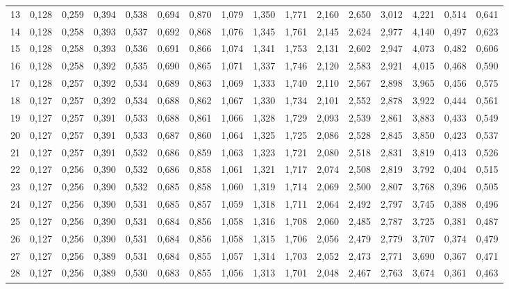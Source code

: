 \documentclass[
]{article}
\begin{document}
\begin{table}[!h]
{\begin{tabular}[t]{lccccccccccccccc}
13 & 0,128 & 0,259 & 0,394 & 0,538 & 0,694 & 0,870 & 1,079 & 1,350 & 1,771 & 2,160 & 2,650 & 3,012 & 4,221 & 0,514 & 0,641\\
14 & 0,128 & 0,258 & 0,393 & 0,537 & 0,692 & 0,868 & 1,076 & 1,345 & 1,761 & 2,145 & 2,624 & 2,977 & 4,140 & 0,497 & 0,623\\
15 & 0,128 & 0,258 & 0,393 & 0,536 & 0,691 & 0,866 & 1,074 & 1,341 & 1,753 & 2,131 & 2,602 & 2,947 & 4,073 & 0,482 & 0,606\\
16 & 0,128 & 0,258 & 0,392 & 0,535 & 0,690 & 0,865 & 1,071 & 1,337 & 1,746 & 2,120 & 2,583 & 2,921 & 4,015 & 0,468 & 0,590\\
17 & 0,128 & 0,257 & 0,392 & 0,534 & 0,689 & 0,863 & 1,069 & 1,333 & 1,740 & 2,110 & 2,567 & 2,898 & 3,965 & 0,456 & 0,575\\
18 & 0,127 & 0,257 & 0,392 & 0,534 & 0,688 & 0,862 & 1,067 & 1,330 & 1,734 & 2,101 & 2,552 & 2,878 & 3,922 & 0,444 & 0,561\\
19 & 0,127 & 0,257 & 0,391 & 0,533 & 0,688 & 0,861 & 1,066 & 1,328 & 1,729 & 2,093 & 2,539 & 2,861 & 3,883 & 0,433 & 0,549\\
20 & 0,127 & 0,257 & 0,391 & 0,533 & 0,687 & 0,860 & 1,064 & 1,325 & 1,725 & 2,086 & 2,528 & 2,845 & 3,850 & 0,423 & 0,537\\
21 & 0,127 & 0,257 & 0,391 & 0,532 & 0,686 & 0,859 & 1,063 & 1,323 & 1,721 & 2,080 & 2,518 & 2,831 & 3,819 & 0,413 & 0,526\\
22 & 0,127 & 0,256 & 0,390 & 0,532 & 0,686 & 0,858 & 1,061 & 1,321 & 1,717 & 2,074 & 2,508 & 2,819 & 3,792 & 0,404 & 0,515\\
23 & 0,127 & 0,256 & 0,390 & 0,532 & 0,685 & 0,858 & 1,060 & 1,319 & 1,714 & 2,069 & 2,500 & 2,807 & 3,768 & 0,396 & 0,505\\
24 & 0,127 & 0,256 & 0,390 & 0,531 & 0,685 & 0,857 & 1,059 & 1,318 & 1,711 & 2,064 & 2,492 & 2,797 & 3,745 & 0,388 & 0,496\\
25 & 0,127 & 0,256 & 0,390 & 0,531 & 0,684 & 0,856 & 1,058 & 1,316 & 1,708 & 2,060 & 2,485 & 2,787 & 3,725 & 0,381 & 0,487\\
26 & 0,127 & 0,256 & 0,390 & 0,531 & 0,684 & 0,856 & 1,058 & 1,315 & 1,706 & 2,056 & 2,479 & 2,779 & 3,707 & 0,374 & 0,479\\
27 & 0,127 & 0,256 & 0,389 & 0,531 & 0,684 & 0,855 & 1,057 & 1,314 & 1,703 & 2,052 & 2,473 & 2,771 & 3,690 & 0,367 & 0,471\\
28 & 0,127 & 0,256 & 0,389 & 0,530 & 0,683 & 0,855 & 1,056 & 1,313 & 1,701 & 2,048 & 2,467 & 2,763 & 3,674 & 0,361 & 0,463\\

\end{tabular}}
\end{table}
\end{document}
